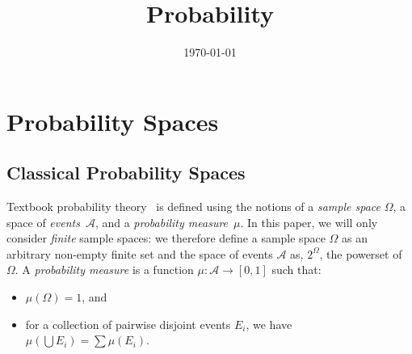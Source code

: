 \documentclass{article}
\theoremstyle{remark}
\newcommand{\events}{\ensuremath{\mathcal{A}}}
\newcommand{\pmeas}{\ensuremath{\mu}}
\begin{document}
\title{Probability}
\author{}
\date{\today}
\maketitle

\section{Probability Spaces} 

\subsection{Classical Probability Spaces}
 
Textbook probability
theory~\cite{inun.425605319950101,GrahamKnuthPatashnik1994,rohatgi2011introduction}
is defined using the notions of a \emph{sample space} $\Omega$, a
space of \emph{events}~$\events$, and a \emph{probability
  measure}~$\pmeas$. In this paper, we will only consider
\emph{finite} sample spaces: we therefore define a sample space
$\Omega$ as an arbitrary non-empty finite set and the space of events
$\events$ as, $2^\Omega$, the powerset of $\Omega$. A \emph{probability
measure} is a function $\pmeas : \events \rightarrow [0,1]$ such that:
\begin{itemize}
\item $\pmeas(\Omega) = 1$, and 
\item for a collection of pairwise disjoint events $E_i$, we have
  $\pmeas(\bigcup E_i) = \sum \pmeas(E_i)$. 
\end{itemize}
\end{document}
